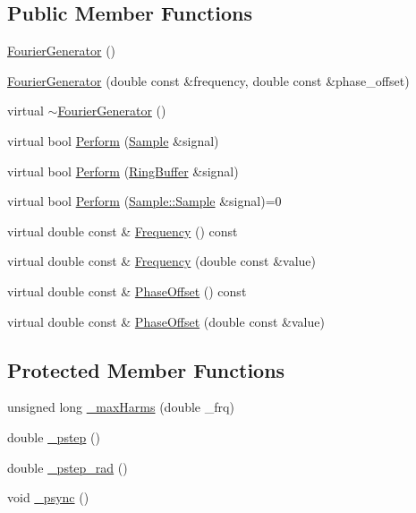 \subsection*{Public Member Functions}
\begin{DoxyCompactItemize}
\item 
\hyperlink{classDSG_1_1FourierGenerator_a43fa07fd160c41fd679a5bd2843a5b0e}{Fourier\+Generator} ()
\item 
\hyperlink{classDSG_1_1FourierGenerator_ad3d1099abd1bfedc46f11a5920c0c21b}{Fourier\+Generator} (double const \&frequency, double const \&phase\+\_\+offset)
\item 
virtual \hyperlink{classDSG_1_1FourierGenerator_ab344182f22a7b4d05cbd875a8fa6e40a}{$\sim$\+Fourier\+Generator} ()
\item 
virtual bool \hyperlink{classDSG_1_1FourierGenerator_a7f5e34e65c1fe757318fb5b063dabde9}{Perform} (\hyperlink{classDSG_1_1Sample}{Sample} \&signal)
\item 
virtual bool \hyperlink{classDSG_1_1FourierGenerator_a8b2aca91155dbb524aaf13867f273188}{Perform} (\hyperlink{classDSG_1_1RingBuffer}{Ring\+Buffer} \&signal)
\item 
virtual bool \hyperlink{classDSG_1_1SignalProcess_afdb8220100418893950c1161dd24db67}{Perform} (\hyperlink{classDSG_1_1Sample_aaf2e30d73911eccea99b53eeee15b612}{Sample\+::\+Sample} \&signal)=0
\item 
virtual double const \& \hyperlink{classDSG_1_1SignalGenerator_aedac746c5a70818d120858542ecb7c45}{Frequency} () const 
\item 
virtual double const \& \hyperlink{classDSG_1_1SignalGenerator_ae3ce8d45bafabbd86a0f535b15c3cd46}{Frequency} (double const \&value)
\item 
virtual double const \& \hyperlink{classDSG_1_1SignalGenerator_a1ce521847edd0b837fd840998f906b4b}{Phase\+Offset} () const 
\item 
virtual double const \& \hyperlink{classDSG_1_1SignalGenerator_a08b71b1f30ba65e629642c570291dc0e}{Phase\+Offset} (double const \&value)
\end{DoxyCompactItemize}
\subsection*{Protected Member Functions}
\begin{DoxyCompactItemize}
\item 
unsigned long \hyperlink{classDSG_1_1FourierGenerator_a6b6e3bbad8ff7443d9ed71f4cdf76739}{\+\_\+max\+Harms} (double \+\_\+frq)
\item 
double \hyperlink{classDSG_1_1SignalGenerator_ac0d781b8673b3a283bf7c133290ede50}{\+\_\+pstep} ()
\item 
double \hyperlink{classDSG_1_1SignalGenerator_ae660eb4caa88b8d278f8d24d0908a487}{\+\_\+pstep\+\_\+rad} ()
\item 
void \hyperlink{classDSG_1_1SignalGenerator_a05baccb38d1e52860d4fcf7cb8430efc}{\+\_\+psync} ()
\end{DoxyCompactItemize}
